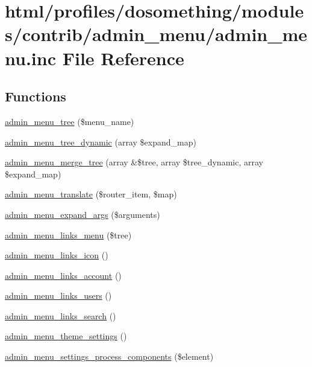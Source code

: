 \hypertarget{admin__menu_8inc}{
\section{html/profiles/dosomething/modules/contrib/admin\_\-menu/admin\_\-menu.inc File Reference}
\label{admin__menu_8inc}
}
\subsection*{Functions}
\begin{DoxyCompactItemize}
\item 
\hyperlink{admin__menu_8inc_a7155f3b662374386ddc07f147074fcf1}{admin\_\-menu\_\-tree} (\$menu\_\-name)
\item 
\hyperlink{admin__menu_8inc_a84698cac1efd2078ef2763865995e226}{admin\_\-menu\_\-tree\_\-dynamic} (array \$expand\_\-map)
\item 
\hyperlink{admin__menu_8inc_a575d57ae5a9c1a4b8729ef022e17e019}{admin\_\-menu\_\-merge\_\-tree} (array \&\$tree, array \$tree\_\-dynamic, array \$expand\_\-map)
\item 
\hyperlink{admin__menu_8inc_a6f21769e09533eece734c5f86e777283}{admin\_\-menu\_\-translate} (\$router\_\-item, \$map)
\item 
\hyperlink{admin__menu_8inc_ad075bcaf2a762dfd3e24bbe473aea445}{admin\_\-menu\_\-expand\_\-args} (\$arguments)
\item 
\hyperlink{admin__menu_8inc_afbb93090bb402d1d524e666d370ffec5}{admin\_\-menu\_\-links\_\-menu} (\$tree)
\item 
\hyperlink{admin__menu_8inc_abb0305b57b5e84d5bb49059d16e55aa0}{admin\_\-menu\_\-links\_\-icon} ()
\item 
\hyperlink{admin__menu_8inc_a532d8549ee18014ea986a2859b0210dc}{admin\_\-menu\_\-links\_\-account} ()
\item 
\hyperlink{admin__menu_8inc_aa054287a0a1394edc680d591f3ee1ae4}{admin\_\-menu\_\-links\_\-users} ()
\item 
\hyperlink{admin__menu_8inc_a9c16c388d608eb3e3f7106e61080203d}{admin\_\-menu\_\-links\_\-search} ()
\item 
\hyperlink{admin__menu_8inc_a4e3734f65911708ed221edc2a7007a23}{admin\_\-menu\_\-theme\_\-settings} ()
\item 
\hyperlink{admin__menu_8inc_ad849bfde07af29eb7536133da2f2b3be}{admin\_\-menu\_\-settings\_\-process\_\-components} (\$element)

\end{DoxyCompactItemize}
